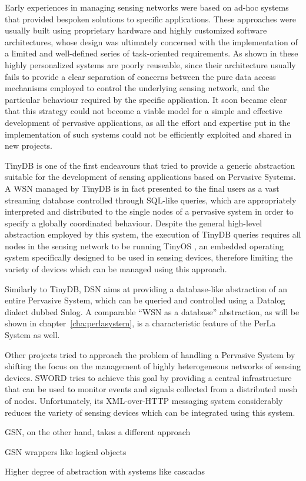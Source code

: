Early experiences in managing sensing networks were based on ad-hoc systems
that provided bespoken solutions to specific applications. These approaches
were usually built using proprietary hardware and highly customized software
architectures, whose design was ultimately concerned with the implementation of
a limited and well-defined series of task-oriented requirements. As shown in
\cite{hartung2006firewxnet} \cite{mainwaring2002wireless}
\cite{werner2005monitoring} \cite{juang2002energy} these highly personalized
systems are poorly reuseable, since their architecture usually fails to provide
a clear separation of concerns between the pure data access mechanisms employed
to control the underlying sensing network, and the particular behaviour
required by the specific application. It soon became clear that this strategy
could not become a viable model for a simple and effective development of
pervasive applications, as all the effort and expertise put in the
implementation of such systems could not be efficiently exploited and shared in
new projects.

TinyDB \cite{madden2005tinydb} is one of the first endeavours that tried to
provide a generic abstraction suitable for the development of sensing
applications based on Pervasive Systems. A WSN managed by TinyDB is in fact
presented to the final users as a vast streaming database controlled through
SQL-like queries, which are appropriately interpreted and distributed to the
single nodes of a pervasive system in order to specify a globally coordinated
behaviour. Despite the general high-level abstraction employed by this system,
the execution of TinyDB queries requires all nodes in the sensing network to be
running TinyOS \cite{levis2005tinyos}, an embedded operating system
specifically designed to be used in sensing devices, therefore limiting the
variety of devices which can be managed using this approach.

Similarly to TinyDB, DSN \cite{chu2006entirely} aims at providing a
database-like abstraction of an entire Pervasive System, which can be queried
and controlled using a Datalog dialect dubbed Snlog. A comparable ``WSN as a
database'' abstraction, as will be shown in chapter~\ref{cha:perlasystem}, is a
characteristic feature of the PerLa System as well.

Other projects tried to approach the problem of handling a Pervasive System by
shifting the focus on the management of highly heterogeneous networks of
sensing devices. SWORD \cite{sword} tries to achieve this goal by providing a
central infrastructure that can be used to monitor events and signals collected
from a distributed mesh of nodes. Unfortunately, its XML-over-HTTP messaging
system considerably reduces the variety of sensing devices which can be
integrated using this system.

GSN, on the other hand, takes a different approach


GSN wrappers like logical objects

Higher degree of abstraction with systems like cascadas
